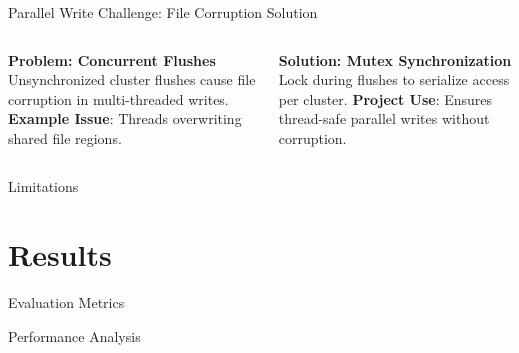 \documentclass[aspectratio=169]{beamer}
\begin{document}
\begin{frame}{Parallel Write Challenge: File Corruption Solution}
  \begin{columns}
    \textbf{Problem: Concurrent Flushes}
    \small Unsynchronized cluster flushes cause file corruption in multi-threaded writes.
    \vspace{0.5em}
    \textbf{Example Issue}: Threads overwriting shared file regions.

    \textbf{Solution: Mutex Synchronization}
    \small Lock during flushes to serialize access per cluster.
    \vspace{0.5em}
    \vspace{0.5em}
    \textbf{Project Use}: Ensures thread-safe parallel writes without corruption.
  \end{columns}
\end{frame}

\begin{frame}{Limitations}
\end{frame}

\section{Results}

\begin{frame}{Evaluation Metrics}
\end{frame}

\begin{frame}{Performance Analysis}
\end{frame}
\end{document}

